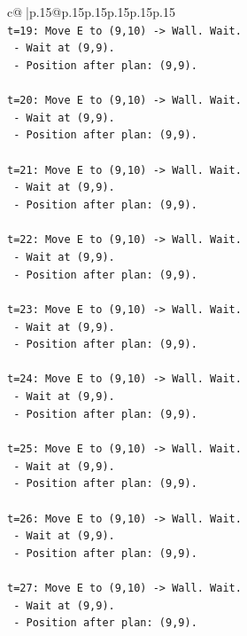 \documentclass{article}
\begin{document}
{\begin{supertabular}{c@{$\;$}|p{.15\linewidth}@{}p{.15\linewidth}p{.15\linewidth}p{.15\linewidth}p{.15\linewidth}p{.15\linewidth}}
{{{\\ 
\texttt{t=19: Move E to (9,10) {-}> Wall. Wait.} \\
\texttt{   {-} Wait at (9,9).} \\
\texttt{   {-} Position after plan: (9,9).} \\
\\ 
\texttt{t=20: Move E to (9,10) {-}> Wall. Wait.} \\
\texttt{   {-} Wait at (9,9).} \\
\texttt{   {-} Position after plan: (9,9).} \\
\\ 
\texttt{t=21: Move E to (9,10) {-}> Wall. Wait.} \\
\texttt{   {-} Wait at (9,9).} \\
\texttt{   {-} Position after plan: (9,9).} \\
\\ 
\texttt{t=22: Move E to (9,10) {-}> Wall. Wait.} \\
\texttt{   {-} Wait at (9,9).} \\
\texttt{   {-} Position after plan: (9,9).} \\
\\ 
\texttt{t=23: Move E to (9,10) {-}> Wall. Wait.} \\
\texttt{   {-} Wait at (9,9).} \\
\texttt{   {-} Position after plan: (9,9).} \\
\\ 
\texttt{t=24: Move E to (9,10) {-}> Wall. Wait.} \\
\texttt{   {-} Wait at (9,9).} \\
\texttt{   {-} Position after plan: (9,9).} \\
\\ 
\texttt{t=25: Move E to (9,10) {-}> Wall. Wait.} \\
\texttt{   {-} Wait at (9,9).} \\
\texttt{   {-} Position after plan: (9,9).} \\
\\ 
\texttt{t=26: Move E to (9,10) {-}> Wall. Wait.} \\
\texttt{   {-} Wait at (9,9).} \\
\texttt{   {-} Position after plan: (9,9).} \\
\\ 
\texttt{t=27: Move E to (9,10) {-}> Wall. Wait.} \\
\texttt{   {-} Wait at (9,9).} \\
\texttt{   {-} Position after plan: (9,9).} \\
}}}
\end{supertabular}}
\end{document}
